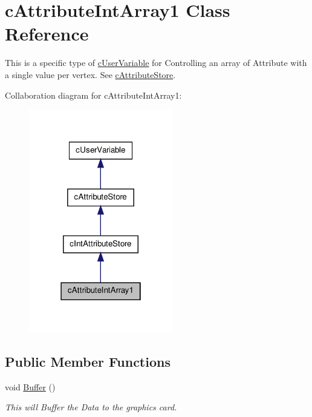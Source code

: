 \hypertarget{classc_attribute_int_array1}{
\section{cAttributeIntArray1 Class Reference}
\label{classc_attribute_int_array1}
}


This is a specific type of \hyperlink{classc_user_variable}{cUserVariable} for Controlling an array of Attribute with a single value per vertex. See \hyperlink{classc_attribute_store}{cAttributeStore}.  




Collaboration diagram for cAttributeIntArray1:\nopagebreak
\begin{figure}[H]
\begin{center}
\leavevmode
\includegraphics[width=178pt]{classc_attribute_int_array1__coll__graph}
\end{center}
\end{figure}
\subsection*{Public Member Functions}
\begin{DoxyCompactItemize}
\item 
\hypertarget{classc_attribute_int_array1_ab75b77d17c0a0ab5e34fc35d471ace59}{
void \hyperlink{classc_attribute_int_array1_ab75b77d17c0a0ab5e34fc35d471ace59}{Buffer} ()}
\label{classc_attribute_int_array1_ab75b77d17c0a0ab5e34fc35d471ace59}

\begin{DoxyCompactList}\small\item\em This will Buffer the Data to the graphics card. \end{DoxyCompactList}\end{DoxyCompactItemize}


